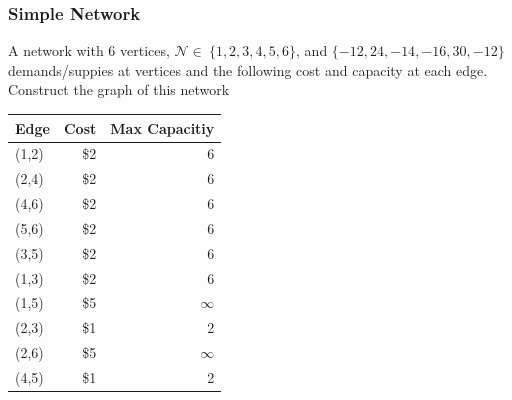 \documentclass[10pt,handout,notes=show]{beamer}
\begin{document}
\begin{frame}
  \frametitle{Simple Network }

  \small{
   A network with 6 vertices, $\mathcal{N} \in\ \{1,2,3,4,5,6 \}$, and $\{-12,24,-14,-16,30,-12\}$ demands/suppies at vertices and the following cost and capacity at each edge. Construct the graph of this network
  \begin{center}
  \begin{tabular}{lrr}\hline
    Edge    & Cost  & Max Capacitiy \\ \hline
    (1,2)   &  \$2    &  6 \\
    (2,4)   &  \$2    &  6 \\
    (4,6)   &  \$2    &  6 \\
    (5,6)   &  \$2    &  6 \\
    (3,5)   &  \$2    &  6 \\
    (1,3)   &  \$2    &  6 \\
    (1,5)   &  \$5    &  $\infty$ \\
    (2,3)   &  \$1    &  2 \\
    (2,6)   &  \$5    &  $\infty$ \\
    (4,5)   &  \$1    &  2 \\ \hline
  \end{tabular}
  \end{center}
  }

\end{frame}
\end{document}
